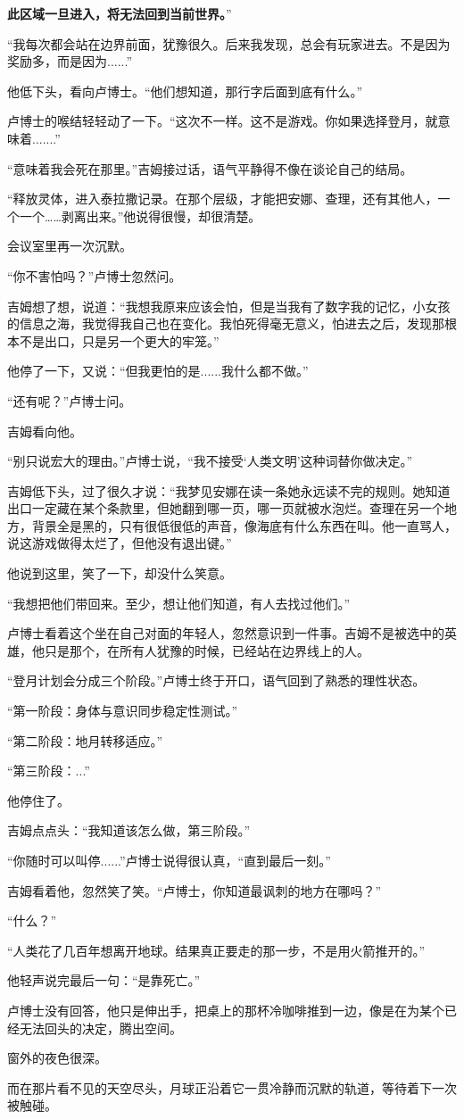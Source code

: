 \textbf{此区域一旦进入，将无法回到当前世界。}”

“我每次都会站在边界前面，犹豫很久。后来我发现，总会有玩家进去。不是因为奖励多，而是因为......”

他低下头，看向卢博士。“他们想知道，那行字后面到底有什么。”

卢博士的喉结轻轻动了一下。“这次不一样。这不是游戏。你如果选择登月，就意味着.......”

“意味着我会死在那里。”吉姆接过话，语气平静得不像在谈论自己的结局。

“释放灵体，进入泰拉撒记录。在那个层级，才能把安娜、查理，还有其他人，一个一个……剥离出来。”他说得很慢，却很清楚。

会议室里再一次沉默。

“你不害怕吗？”卢博士忽然问。

吉姆想了想，说道：“我想我原来应该会怕，但是当我有了数字我的记忆，小女孩的信息之海，我觉得我自己也在变化。我怕死得毫无意义，怕进去之后，发现那根本不是出口，只是另一个更大的牢笼。”

他停了一下，又说：“但我更怕的是......我什么都不做。”

“还有呢？”卢博士问。

吉姆看向他。

“别只说宏大的理由。”卢博士说，“我不接受‘人类文明’这种词替你做决定。”

吉姆低下头，过了很久才说：“我梦见安娜在读一条她永远读不完的规则。她知道出口一定藏在某个条款里，但她翻到哪一页，哪一页就被水泡烂。查理在另一个地方，背景全是黑的，只有很低很低的声音，像海底有什么东西在叫。他一直骂人，说这游戏做得太烂了，但他没有退出键。”

他说到这里，笑了一下，却没什么笑意。

“我想把他们带回来。至少，想让他们知道，有人去找过他们。”

卢博士看着这个坐在自己对面的年轻人，忽然意识到一件事。吉姆不是被选中的英雄，他只是那个，在所有人犹豫的时候，已经站在边界线上的人。

“登月计划会分成三个阶段。”卢博士终于开口，语气回到了熟悉的理性状态。

“第一阶段：身体与意识同步稳定性测试。”

“第二阶段：地月转移适应。”

“第三阶段：...”

他停住了。

吉姆点点头：“我知道该怎么做，第三阶段。”

“你随时可以叫停......”卢博士说得很认真，“直到最后一刻。”

吉姆看着他，忽然笑了笑。“卢博士，你知道最讽刺的地方在哪吗？”

“什么？”

“人类花了几百年想离开地球。结果真正要走的那一步，不是用火箭推开的。”

他轻声说完最后一句：“是靠死亡。”

卢博士没有回答，他只是伸出手，把桌上的那杯冷咖啡推到一边，像是在为某个已经无法回头的决定，腾出空间。

窗外的夜色很深。

而在那片看不见的天空尽头，月球正沿着它一贯冷静而沉默的轨道，等待着下一次被触碰。
